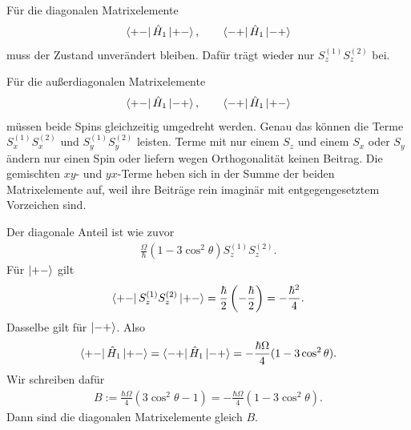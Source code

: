 \documentclass[11pt,a4paper]{scrartcl}
\newcommand{\op}[1]{\hat{#1}}
\begin{document}
\begin{enumerate}[label=(\alph*)]
\begin{calculationbox}
            \begin{calculationbox}[title=Warum diese Terme relevant sind]
                Für die diagonalen Matrixelemente
                \begin{align*}
                    \bra{+-}\op H_1\ket{+-},
                    \qquad
                    \bra{-+}\op H_1\ket{-+}
                \end{align*}
                muss der Zustand unverändert bleiben. Dafür trägt wieder nur $S_z^{(1)}S_z^{(2)}$ bei.

                Für die außerdiagonalen Matrixelemente
                \begin{align*}
                    \bra{+-}\op H_1\ket{-+},
                    \qquad
                    \bra{-+}\op H_1\ket{+-}
                \end{align*}
                müssen beide Spins gleichzeitig umgedreht werden. Genau das können die Terme $S_x^{(1)}S_x^{(2)}$ und $S_y^{(1)}S_y^{(2)}$ leisten. Terme mit nur einem $S_z$ und einem $S_x$ oder $S_y$ ändern nur einen Spin oder liefern wegen Orthogonalität keinen Beitrag. Die gemischten $xy$- und $yx$-Terme heben sich in der Summe der beiden Matrixelemente auf, weil ihre Beiträge rein imaginär mit entgegengesetztem Vorzeichen sind.
            \end{calculationbox}

            \begin{calculationbox}[title=Diagonale Matrixelemente]
                Der diagonale Anteil ist wie zuvor
                \begin{align*}
                    \frac{\Omega}{\hbar}
                    (1-3\cos^2\theta)S_z^{(1)}S_z^{(2)}.
                \end{align*}
                Für $\ket{+-}$ gilt
                \begin{align*}
                    \bra{+-}S_z^{(1)}S_z^{(2)}\ket{+-}
                    =
                    \frac{\hbar}{2}\left(-\frac{\hbar}{2}\right)
                    =
                    -\frac{\hbar^2}{4}.
                \end{align*}
                Dasselbe gilt für $\ket{-+}$. Also
                \begin{align*}
                    \bra{+-}\op H_1\ket{+-}
                    =
                    \bra{-+}\op H_1\ket{-+}
                    =
                    -\frac{\hbar\Omega}{4}(1-3\cos^2\theta).
                \end{align*}
                Wir schreiben dafür
                \begin{align*}
                    B
                    :=
                    \frac{\hbar\Omega}{4}(3\cos^2\theta-1)
                    =
                    -\frac{\hbar\Omega}{4}(1-3\cos^2\theta).
                \end{align*}
                Dann sind die diagonalen Matrixelemente gleich $B$.
            \end{calculationbox}


\end{calculationbox}
\end{enumerate}
\end{document}
